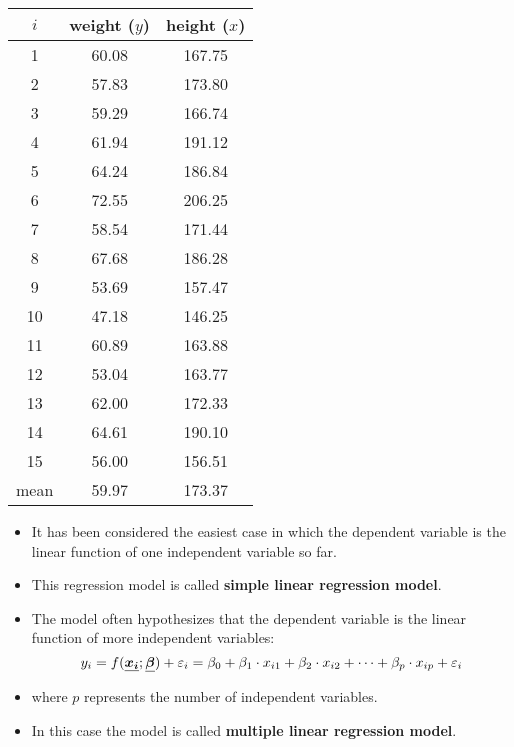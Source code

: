 \begin{frame}
  \begin{center}
    \begin{footnotesize}
      \begin{tabular}{ccc}
        \hline
        $i$ & weight ($ y $) & height ($ x $) \\
        \hline
        1  & 60.08 & 167.75 \\
        2  & 57.83 & 173.80 \\
        3  & 59.29 & 166.74 \\
        4  & 61.94 & 191.12 \\
        5  & 64.24 & 186.84 \\
        6  & 72.55 & 206.25 \\
        7  & 58.54 & 171.44 \\
        8  & 67.68 & 186.28 \\
        9  & 53.69 & 157.47 \\
        10 & 47.18 & 146.25 \\
        11 & 60.89 & 163.88 \\
        12 & 53.04 & 163.77 \\
        13 & 62.00 & 172.33 \\
        14 & 64.61 & 190.10 \\
        15 & 56.00 & 156.51 \\
        \hline
        mean & 59.97 & 173.37 \\
      \end{tabular}
    \end{footnotesize}
  \end{center}
\end{frame}


\begin{frame}
  \vspace{0.25cm}
  \begin{itemize}
    \item It has been considered the easiest case in which the dependent variable is the linear function of one independent variable so far. 
    \vspace{0.25cm}
    \item This regression model is called \textbf{simple linear regression model}.
    \vspace{0.25cm}
    \item The model often hypothesizes that the dependent variable is the linear function of more independent variables:
    \vspace{-0.4cm} $$ y_i = f(\boldsymbol{\underline{x_i}}; \boldsymbol{\underline{\beta}}) + \varepsilon_i = \beta_0 + \beta_1 \cdot x_{i1} + \beta_2 \cdot x_{i2} + \dots + \beta_p \cdot x_{ip} + \varepsilon_i $$\vspace{-1cm}
    \item[] where $ p $ represents the number of independent variables.
    \vspace{0.25cm}
    \item In this case the model is called \textbf{multiple linear regression model}.
  \end{itemize}
\end{frame}

